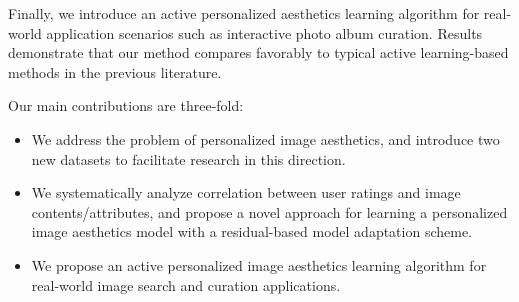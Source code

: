 Finally, we introduce an active personalized aesthetics learning algorithm for real-world application scenarios such as interactive photo album curation. Results demonstrate that our method compares favorably to typical active learning-based methods in the previous literature. 

Our main contributions are three-fold:
\begin{itemize}
\vspace{-0.1in}
  \item We address the problem of personalized image aesthetics, and introduce two new datasets to facilitate research in this direction.
  \vspace{-0.1in}
  \item We systematically analyze correlation between user ratings and image contents/attributes, and propose a novel approach for learning a personalized image aesthetics model with a residual-based model adaptation scheme.
  \vspace{-0.1in}
   \item We propose an active personalized image aesthetics learning algorithm for real-world image search and curation applications.
\end{itemize}

